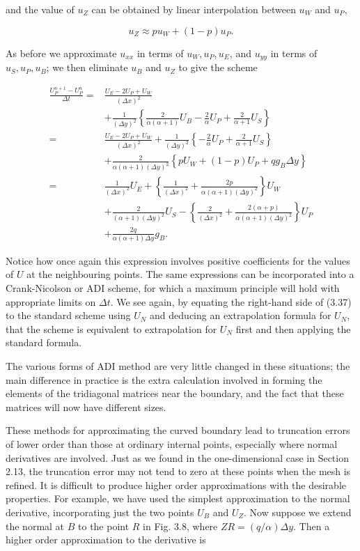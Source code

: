 \documentclass[10pt]{article}
\begin{document}
and the value of \(u_{Z}\) can be obtained by linear interpolation between \(u_{W}\) and \(u_{P}\),

\[
u_{Z} \approx p u_{W}+(1-p) u_{P} .
\]

As before we approximate \(u_{x x}\) in terms of \(u_{W}, u_{P}, u_{E}\), and \(u_{y y}\) in terms of \(u_{S}, u_{P}, u_{B}\); we then eliminate \(u_{B}\) and \(u_{Z}\) to give the scheme

\[
\begin{aligned}
\frac{U_{P}^{n+1}-U_{P}^{n}}{\Delta t}= & \frac{U_{E}-2 U_{P}+U_{W}}{(\Delta x)^{2}} \\
& +\frac{1}{(\Delta y)^{2}}\left\{\frac{2}{\alpha(\alpha+1)} U_{B}-\frac{2}{\alpha} U_{P}+\frac{2}{\alpha+1} U_{S}\right\} \\
= & \frac{U_{E}-2 U_{P}+U_{W}}{(\Delta x)^{2}}+\frac{1}{(\Delta y)^{2}}\left\{-\frac{2}{\alpha} U_{P}+\frac{2}{\alpha+1} U_{S}\right\} \\
& +\frac{2}{\alpha(\alpha+1)(\Delta y)^{2}}\left\{p U_{W}+(1-p) U_{P}+q g_{B} \Delta y\right\} \\
= & \frac{1}{(\Delta x)^{2}} U_{E}+\left\{\frac{1}{(\Delta x)^{2}}+\frac{2 p}{\alpha(\alpha+1)(\Delta y)^{2}}\right\} U_{W} \\
& +\frac{2}{(\alpha+1)(\Delta y)^{2}} U_{S}-\left\{\frac{2}{(\Delta x)^{2}}+\frac{2(\alpha+p)}{\alpha(\alpha+1)(\Delta y)^{2}}\right\} U_{P} \\
& +\frac{2 q}{\alpha(\alpha+1) \Delta y} g_{B} .
\end{aligned}
\]

Notice how once again this expression involves positive coefficients for the values of \(U\) at the neighbouring points. The same expressions can be incorporated into a Crank-Nicolson or ADI scheme, for which a maximum principle will hold with appropriate limits on \(\Delta t\). We see again, by equating the right-hand side of (3.37) to the standard scheme using \(U_{N}\) and deducing an extrapolation formula for \(U_{N}\), that the scheme is equivalent to extrapolation for \(U_{N}\) first and then applying the standard formula.

The various forms of ADI method are very little changed in these situations; the main difference in practice is the extra calculation involved in forming the elements of the tridiagonal matrices near the boundary, and the fact that these matrices will now have different sizes.

These methods for approximating the curved boundary lead to truncation errors of lower order than those at ordinary internal points, especially where normal derivatives are involved. Just as we found in the one-dimensional case in Section 2.13, the truncation error may not tend to zero at these points when the mesh is refined. It is difficult to produce higher order approximations with the desirable properties. For example, we have used the simplest approximation to the normal derivative, incorporating just the two points \(U_{B}\) and \(U_{Z}\). Now suppose we extend the normal at \(B\) to the point \(R\) in Fig. 3.8, where \(Z R=(q / \alpha) \Delta y\). Then a higher order approximation to the derivative is
\end{document}
